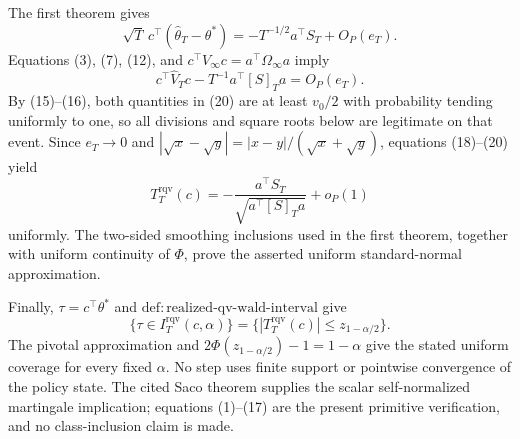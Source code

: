 The first theorem gives
\[
 \sqrt T\,c^\top(\widehat\theta_T-\theta^*)
 =-T^{-1/2}a^\top S_T+O_P(e_T). \tag{19}
\]
Equations (3), (7), (12), and \(c^\top V_\infty c=a^\top\Omega_\infty a\) imply
\[
 c^\top\widehat V_Tc-T^{-1}a^\top[S]_Ta=O_P(e_T). \tag{20}
\]
By (15)--(16), both quantities in (20) are at least \(v_0/2\) with probability tending uniformly to one, so all divisions and square roots below are legitimate on that event. Since \(e_T\to0\) and \(|\sqrt x-\sqrt y|=|x-y|/(\sqrt x+\sqrt y)\), equations (18)--(20) yield
\[
 T_T^{\mathrm{rqv}}(c)
 =-\frac{a^\top S_T}{\sqrt{a^\top[S]_Ta}}+o_P(1) \tag{21}
\]
uniformly. The two-sided smoothing inclusions used in the first theorem, together with uniform continuity of \(\Phi\), prove the asserted uniform standard-normal approximation.

Finally, \(\tau=c^\top\theta^*\) and \(\mathrm{def:realized\text{-}qv\text{-}wald\text{-}interval}\) give
\[
 \{\tau\in I_T^{\mathrm{rqv}}(c,\alpha)\}
 =\{|T_T^{\mathrm{rqv}}(c)|\le z_{1-\alpha/2}\}. \tag{22}
\]
The pivotal approximation and \(2\Phi(z_{1-\alpha/2})-1=1-\alpha\) give the stated uniform coverage for every fixed \(\alpha\). No step uses finite support or pointwise convergence of the policy state. The cited Saco theorem supplies the scalar self-normalized martingale implication; equations (1)--(17) are the present primitive verification, and no class-inclusion claim is made.
